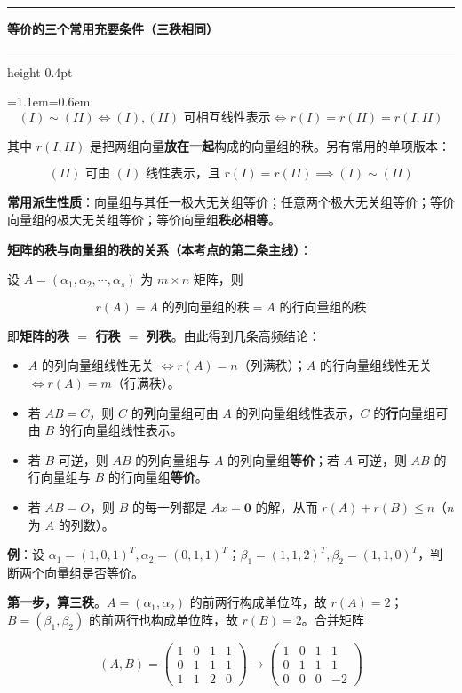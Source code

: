 \documentclass[11pt,openany,UTF8]{ctexbook}
\newcommand{\callouthead}[2]{%
  \par\addvspace{7pt}\noindent
  {\color{#1}\rule[-0.15em]{3pt}{1.05em}}\hspace{0.5em}%
  {\bfseries\color{#1}#2}\par\nobreak\vspace{-0.35em}%
  {\color{rulesep}\hrule height 0.4pt}\nobreak\vspace{0.45em}%
  \begingroup\small\setlength{\parindent}{0pt}%
  \leftskip=1.1em\rightskip=0.6em\noindent\ignorespaces}
\newcommand{\calloutend}{\par\endgroup\addvspace{7pt}}
\newenvironment{callkey}[1]{\callouthead{keybar}{#1}}{\calloutend}
\begin{document}
\begin{callkey}{等价的三个常用充要条件（三秩相同）}
\[(I)\sim(II)\iff (I),(II)\text{ 可相互线性表示}\iff r(I)=r(II)=r(I,II)\]

其中 $r(I,II)$ 是把两组向量\textbf{放在一起}构成的向量组的秩。另有常用的单项版本：

\[(II)\text{ 可由 }(I)\text{ 线性表示，且 } r(I)=r(II)\implies (I)\sim(II)\]

\textbf{常用派生性质}：向量组与其任一极大无关组等价；任意两个极大无关组等价；等价向量组的极大无关组等价；等价向量组\textbf{秩必相等}。

\end{callkey}

\textbf{矩阵的秩与向量组的秩的关系（本考点的第二条主线）}：

设 $A=(\alpha_1,\alpha_2,\cdots,\alpha_s)$ 为 $m\times n$ 矩阵，则

\[r(A)=A\text{ 的列向量组的秩}=A\text{ 的行向量组的秩}\]

即\textbf{矩阵的秩 $=$ 行秩 $=$ 列秩}。由此得到几条高频结论：

\begin{itemize}
\item $A$ 的列向量组线性无关 $\iff r(A)=n$（列满秩）；$A$ 的行向量组线性无关 $\iff r(A)=m$（行满秩）。
\item 若 $AB=C$，则 $C$ 的\textbf{列}向量组可由 $A$ 的列向量组线性表示，$C$ 的\textbf{行}向量组可由 $B$ 的行向量组线性表示。
\item 若 $B$ 可逆，则 $AB$ 的列向量组与 $A$ 的列向量组\textbf{等价}；若 $A$ 可逆，则 $AB$ 的行向量组与 $B$ 的行向量组\textbf{等价}。
\item 若 $AB=O$，则 $B$ 的每一列都是 $Ax=\mathbf{0}$ 的解，从而 $r(A)+r(B)\le n$（$n$ 为 $A$ 的列数）。
\end{itemize}
\textbf{例}：设 $\alpha_1=(1,0,1)^T,\alpha_2=(0,1,1)^T$；$\beta_1=(1,1,2)^T,\beta_2=(1,1,0)^T$，判断两个向量组是否等价。

\textbf{第一步，算三秩}。$A=(\alpha_1,\alpha_2)$ 的前两行构成单位阵，故 $r(A)=2$；$B=(\beta_1,\beta_2)$ 的前两行也构成单位阵，故 $r(B)=2$。合并矩阵

\[(A,B)=\begin{pmatrix} 1 & 0 & 1 & 1 \\ 0 & 1 & 1 & 1 \\ 1 & 1 & 2 & 0 \end{pmatrix}
\to\begin{pmatrix} 1 & 0 & 1 & 1 \\ 0 & 1 & 1 & 1 \\ 0 & 0 & 0 & -2 \end{pmatrix}\]
\end{document}
